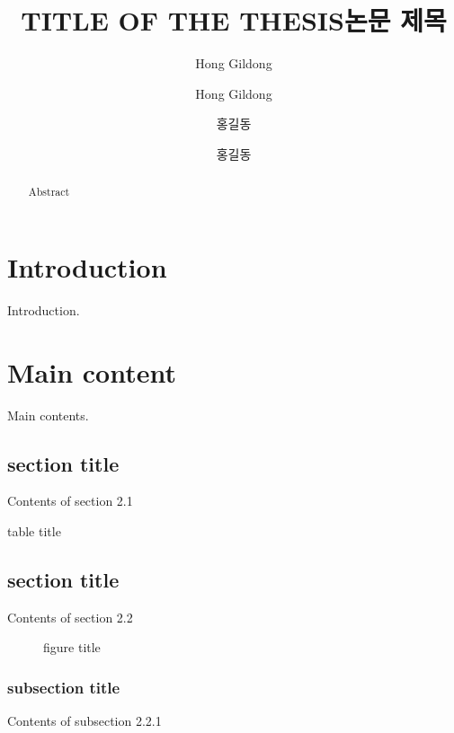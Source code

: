 \documentclass[oneside,master]{snuthesis_utf8}
\title{TITLE OF THE THESIS}
\title*{논문 제목}
\author{Hong Gildong}
\author*{Hong Gildong} %
\begin{document}
\makefrontcover
\makefrontcover

\author{홍길동}
\author*{홍길동} %

\makeapproval

\cleardoublepage
{}

\begin{abstract}
Abstract
\end{abstract}

\cleardoublepage
{}
\tableofcontents

\cleardoublepage
{}
\listoffigures

\cleardoublepage
{}
\listoftables

\cleardoublepage
{}

\chapter{Introduction}
Introduction. 

\chapter{Main content}
Main contents.

\section{section title}
Contents of section 2.1

\begin{table}[!hbp]
\caption{table title}
\end{table}

\section{section title}
Contents of section 2.2


\begin{figure}[!hbp]
\caption{figure title}
\end{figure}

\subsection{subsection title}
Contents of subsection 2.2.1
\end{document}
